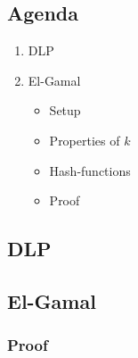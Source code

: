 

\subsection*{Agenda}
\begin{enumerate}
\item DLP
\item El-Gamal
  \begin{itemize}
  \item Setup
  \item Properties of $k$
  \item Hash-functions
  \item Proof
  \end{itemize}
\end{enumerate}

\subsection{DLP}


\subsection{El-Gamal}


\subsubsection*{Proof}

